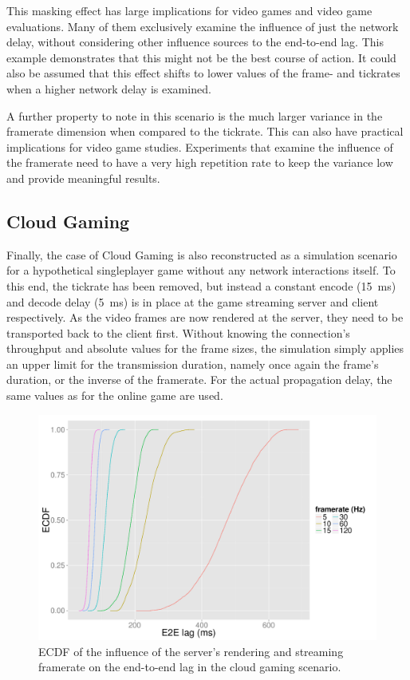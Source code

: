 This masking effect has large implications for video games and video game evaluations. Many of them exclusively examine the influence of just the network delay, without considering other influence sources to the end-to-end lag. This example demonstrates that this might not be the best course of action. It could also be assumed that this effect shifts to lower values of the frame- and tickrates when a higher network delay is examined.

A further property to note in this scenario is the much larger variance in the framerate dimension when compared to the tickrate. This can also have practical implications for video game studies. Experiments that examine the influence of the framerate need to have a very high repetition rate to keep the variance low and provide meaningful results.


\subsection{Cloud Gaming}

Finally, the case of Cloud Gaming is also reconstructed as a simulation scenario for a hypothetical singleplayer game without any network interactions itself. To this end, the tickrate has been removed, but instead a constant encode (\SI{15}{\milli\second}) and decode delay (\SI{5}{\milli\second}) is in place at the game streaming server and client respectively. As the video frames are now rendered at the server, they need to be transported back to the client first. 
Without knowing the connection's throughput and absolute values for the frame sizes, the simulation simply applies an upper limit for the transmission duration, namely once again the frame's duration, or the inverse of the framerate. For the actual propagation delay, the same values as for the online game are used.

\begin{figure}[!t]
	\centering
	\includegraphics[width=1.0\columnwidth]{../simulation/visualization/cloudgaming-lag-cdf.pdf}
	\caption{\acrshort{ECDF} of the influence of the server's rendering and streaming framerate on the end-to-end lag in the cloud gaming scenario.}
\label{fig:cloud-e2e-delay-sim}
\end{figure}

